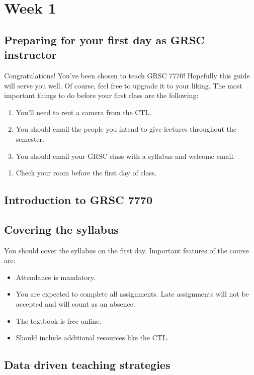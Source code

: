 \section{Week 1}
\label{sec:week-1}

\subsection{Preparing for your first day as GRSC instructor}
\label{sec:preparing-your-first}

Congratulations!  You've been chosen to teach GRSC 7770!  Hopefully this guide will serve you well.  Of course, feel free to upgrade it to your liking.  The most important things to do before your first class are the following:

\begin{enumerate}
\item You'll need to rent a camera from the CTL.
\item You should email the people you intend to give lectures throughout the semester.
\item You should email your GRSC class with a syllabus and welcome email.  
\end{enumerate}

\begin{enumerate}
\item Check your room before the first day of class.  
\end{enumerate}

\subsection{Introduction to GRSC 7770}
\label{sec:intr-grsc-7770}

\subsection{Covering the syllabus}
\label{sec:covering-syllabus}

You should cover the syllabus on the first day.  Important features of the course are:
\begin{itemize}
\item Attendance is mandatory.
\item You are expected to complete all assignments.  Late assignments will not be accepted and will count as an absence.
\item The textbook is free online.
\item Should include additional resources like the CTL.
\end{itemize}

\subsection{Data driven teaching strategies}
\label{sec:data-driven-teaching} 



